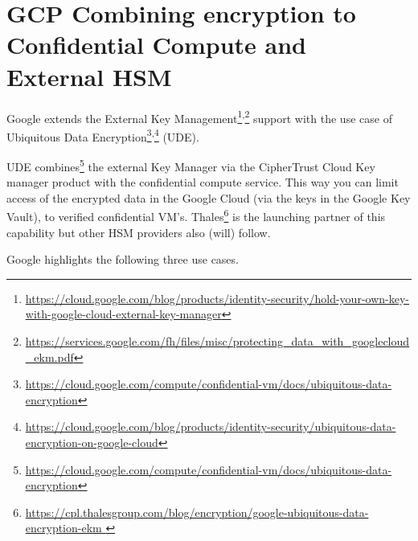 
\section{GCP Combining encryption to Confidential Compute and External HSM}



Google extends the External Key Management\footnote{\url{https://cloud.google.com/blog/products/identity-security/hold-your-own-key-with-google-cloud-external-key-manager}}\textsuperscript{,}\footnote{\url{https://services.google.com/fh/files/misc/protecting_data_with_googlecloud_ekm.pdf}}
support with the use case of Ubiquitous Data Encryption\footnote{\url{ https://cloud.google.com/compute/confidential-vm/docs/ubiquitous-data-encryption}}\textsuperscript{,}\footnote{\url{ https://cloud.google.com/blog/products/identity-security/ubiquitous-data-encryption-on-google-cloud}} (UDE).  

UDE combines\footnote{\url{ https://cloud.google.com/compute/confidential-vm/docs/ubiquitous-data-encryption}} the external Key Manager 
via the CipherTrust Cloud Key manager product 
with the confidential compute service. 
This way you can limit access of the encrypted data in the Google Cloud 
(via the keys in the Google Key Vault), 
to verified confidential VM’s. 
Thales\footnote{\url{https://cpl.thalesgroup.com/blog/encryption/google-ubiquitous-data-encryption-ekm }} 
is the launching partner of this capability 
but other HSM providers also (will) follow.

Google highlights the following three use cases.

